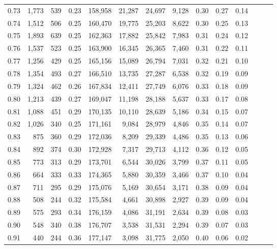 \begin{tabular}{rrrrrrrrrrrrrr}
0.73 &  1,773 &  539 &  0.23 &  158,958 &   21,287 &  24,697 &   9,128 &  0.30 &  0.27 &      0.14 \\
0.74 &  1,512 &  506 &  0.25 &  160,470 &   19,775 &  25,203 &   8,622 &  0.30 &  0.25 &      0.13 \\
0.75 &  1,893 &  639 &  0.25 &  162,363 &   17,882 &  25,842 &   7,983 &  0.31 &  0.24 &      0.12 \\
0.76 &  1,537 &  523 &  0.25 &  163,900 &   16,345 &  26,365 &   7,460 &  0.31 &  0.22 &      0.11 \\
0.77 &  1,256 &  429 &  0.25 &  165,156 &   15,089 &  26,794 &   7,031 &  0.32 &  0.21 &      0.10 \\
0.78 &  1,354 &  493 &  0.27 &  166,510 &   13,735 &  27,287 &   6,538 &  0.32 &  0.19 &      0.09 \\
0.79 &  1,324 &  462 &  0.26 &  167,834 &   12,411 &  27,749 &   6,076 &  0.33 &  0.18 &      0.09 \\
0.80 &  1,213 &  439 &  0.27 &  169,047 &   11,198 &  28,188 &   5,637 &  0.33 &  0.17 &      0.08 \\
0.81 &  1,088 &  451 &  0.29 &  170,135 &   10,110 &  28,639 &   5,186 &  0.34 &  0.15 &      0.07 \\
0.82 &  1,026 &  340 &  0.25 &  171,161 &    9,084 &  28,979 &   4,846 &  0.35 &  0.14 &      0.07 \\
0.83 &    875 &  360 &  0.29 &  172,036 &    8,209 &  29,339 &   4,486 &  0.35 &  0.13 &      0.06 \\
0.84 &    892 &  374 &  0.30 &  172,928 &    7,317 &  29,713 &   4,112 &  0.36 &  0.12 &      0.05 \\
0.85 &    773 &  313 &  0.29 &  173,701 &    6,544 &  30,026 &   3,799 &  0.37 &  0.11 &      0.05 \\
0.86 &    664 &  333 &  0.33 &  174,365 &    5,880 &  30,359 &   3,466 &  0.37 &  0.10 &      0.04 \\
0.87 &    711 &  295 &  0.29 &  175,076 &    5,169 &  30,654 &   3,171 &  0.38 &  0.09 &      0.04 \\
0.88 &    508 &  244 &  0.32 &  175,584 &    4,661 &  30,898 &   2,927 &  0.39 &  0.09 &      0.04 \\
0.89 &    575 &  293 &  0.34 &  176,159 &    4,086 &  31,191 &   2,634 &  0.39 &  0.08 &      0.03 \\
0.90 &    548 &  340 &  0.38 &  176,707 &    3,538 &  31,531 &   2,294 &  0.39 &  0.07 &      0.03 \\
0.91 &    440 &  244 &  0.36 &  177,147 &    3,098 &  31,775 &   2,050 &  0.40 &  0.06 &      0.02 \\

\end{tabular}
